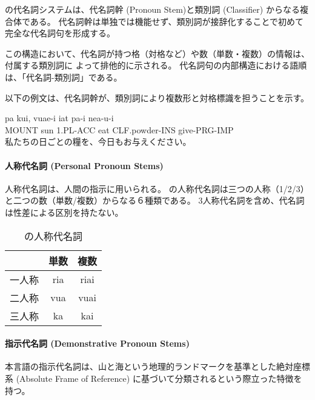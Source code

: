 \langname の代名詞システムは、代名詞幹 (Pronoun Stem)と類別詞 (Classifier) 
からなる複合体である。
代名詞幹は単独では機能せず、類別詞が接辞化することで初めて完全な代名詞句を形成する。

この構造において、代名詞が持つ格（対格など）や数（単数・複数）の情報は、付属する類別詞に
よって排他的に示される。
代名詞句の内部構造における語順は、「代名詞-類別詞」である。

以下の例文は、代名詞幹が、類別詞により複数形と対格標識を担うことを示す。

\begin{exe}
    \ex \gll pa kui, vuae-i iat pa-i nea-u-i \\
        MOUNT sun 1.PL-ACC eat CLF.powder-INS give-PRG-IMP \\
        \glt 私たちの日ごとの糧を、今日もお与えください。
\end{exe}

\paragraph{人称代名詞 (Personal Pronoun Stems)}
人称代名詞は、人間の指示に用いられる。
\langname の人称代名詞は三つの人称（1/2/3）と二つの数（単数/複数）からなる６種類である。
3人称代名詞を含め、代名詞は性差による区別を持たない。

\begin{table}[H]
    \centering
    \begin{tabular}{lcc}
        \toprule
        & 単数 & 複数  \\
        \midrule
        一人称 & ria & riai \\
        二人称 & vua & vuai \\
        三人称 & ka & kai \\
        \bottomrule
    \end{tabular}
    \caption{\centering \langname の人称代名詞}
    \label{tab:pronouns}
\end{table}

\paragraph{指示代名詞 (Demonstrative Pronoun Stems)}
本言語の指示代名詞は、{山と海という地理的ランドマークを基準とした絶対座標系
 (Absolute Frame of Reference) に基づいて分類される}という際立った特徴を持つ。

